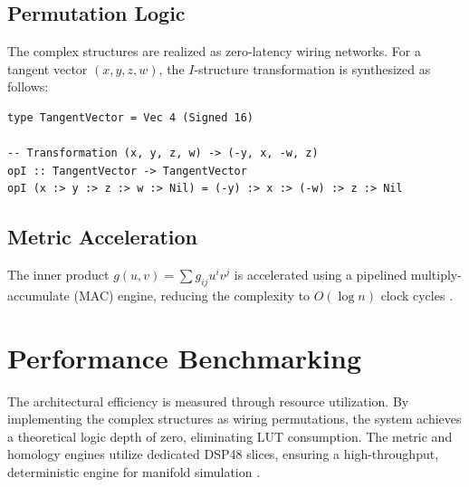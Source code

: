 \documentclass[12pt, a4paper]{article}
\begin{document}
\subsection{Permutation Logic}
The complex structures are realized as zero-latency wiring networks. For a tangent vector $(x, y, z, w)$, the $I$-structure transformation is synthesized as follows:
\begin{lstlisting}[caption=Clash implementation of Structure I]
type TangentVector = Vec 4 (Signed 16)

-- Transformation (x, y, z, w) -> (-y, x, -w, z)
opI :: TangentVector -> TangentVector
opI (x :> y :> z :> w :> Nil) = (-y) :> x :> (-w) :> z :> Nil
\end{lstlisting}

\subsection{Metric Acceleration}
The inner product $g(u, v) = \sum g_{ij} u^i v^j$ is accelerated using a pipelined multiply-accumulate (MAC) engine, reducing the complexity to $O(\log n)$ clock cycles \cite{baas2021functional}.

\section{Performance Benchmarking}
The architectural efficiency is measured through resource utilization. By implementing the complex structures as wiring permutations, the system achieves a theoretical logic depth of zero, eliminating LUT consumption. The metric and homology engines utilize dedicated DSP48 slices, ensuring a high-throughput, deterministic engine for manifold simulation \cite{huybrechts2005complex}.



\end{document}
